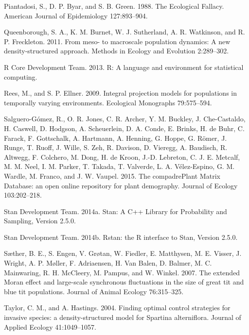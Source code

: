 \documentclass[12pt,]{article}
\begin{document}
Piantadosi, S., D. P. Byar, and S. B. Green. 1988. The Ecological
Fallacy. American Journal of Epidemiology 127:893--904.

Queenborough, S. A., K. M. Burnet, W. J. Sutherland, A. R. Watkinson,
and R. P. Freckleton. 2011. From meso- to macroscale population
dynamics: A new density-structured approach. Methods in Ecology and
Evolution 2:289--302.

R Core Development Team. 2013. R: A language and environment for
statistical computing.

Rees, M., and S. P. Ellner. 2009. Integral projection models for
populations in temporally varying environments. Ecological Monographs
79:575--594.

Salguero-Gómez, R., O. R. Jones, C. R. Archer, Y. M. Buckley, J.
Che-Castaldo, H. Caswell, D. Hodgson, A. Scheuerlein, D. A. Conde, E.
Brinks, H. de Buhr, C. Farack, F. Gottschalk, A. Hartmann, A. Henning,
G. Hoppe, G. Römer, J. Runge, T. Ruoff, J. Wille, S. Zeh, R. Davison, D.
Vieregg, A. Baudisch, R. Altwegg, F. Colchero, M. Dong, H. de Kroon,
J.-D. Lebreton, C. J. E. Metcalf, M. M. Neel, I. M. Parker, T. Takada,
T. Valverde, L. A. Vélez-Espino, G. M. Wardle, M. Franco, and J. W.
Vaupel. 2015. The compadrePlant Matrix Database: an open online
repository for plant demography. Journal of Ecology 103:202--218.

Stan Development Team. 2014a. Stan: A C++ Library for Probability and
Sampling, Version 2.5.0.

Stan Development Team. 2014b. Rstan: the R interface to Stan, Version
2.5.0.

Sæther, B. E., S. Engen, V. Grøtan, W. Fiedler, E. Matthysen, M. E.
Visser, J. Wright, A. P. Møller, F. Adriaensen, H. {Van Balen}, D.
Balmer, M. C. Mainwaring, R. H. McCleery, M. Pampus, and W. Winkel.
2007. The extended Moran effect and large-scale synchronous fluctuations
in the size of great tit and blue tit populations. Journal of Animal
Ecology 76:315--325.

Taylor, C. M., and A. Hastings. 2004. Finding optimal control strategies
for invasive species: a density-structured model for Spartina
alterniflora. Journal of Applied Ecology 41:1049--1057.
\end{document}
